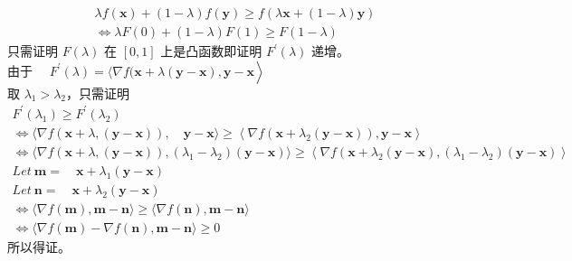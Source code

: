 \documentclass[11pt,letter,notitlepage]{article}
\begin{document}
\begin{solution}
\begin{enumerate}
			\begin{align*}
				\lambda f(\mathbf{x})+(1-\lambda) f(\mathbf{y}) \geqslant f(\lambda \mathbf{x}+(1-\lambda) \mathbf{y}) \\ \Leftrightarrow \lambda F(0)+(1-\lambda) F(1) \geqslant F(1-\lambda)
			\end{align*}
		只需证明 $F(\lambda)$ 在 $[0, 1]$ 上是凸函数即证明 $F^{\prime}(\lambda)$ 递增。\\
		由于 ${\left.\quad F^{\prime}(\lambda)=\langle\nabla f(\mathbf{x}+\lambda (\mathbf{y - x}), \mathbf{y - x}\right\rangle}$\\
		取 $\lambda_1 > \lambda_2 $，只需证明\\
		$\begin{array}{l} { F^{\prime}(\lambda_1) \geqslant F^{\prime}\left(\lambda_{2}\right)} \\ {\Leftrightarrow \langle \nabla f(\mathbf{x}+\lambda,(\mathbf{y}-\mathbf{x})), \quad \mathbf{y}-\mathbf{x} \rangle\geqslant\left\langle \nabla f\left(\mathbf{x}+\lambda_{2}(\mathbf{y}-\mathbf{x})\right), \mathbf{y}-\mathbf{x}\right\rangle} \\ {\Leftrightarrow \langle \nabla f(\mathbf{x}+\lambda,(\mathbf{y}-\mathbf{x})),\left(\lambda_1-\lambda_{2}\right)(\mathbf{y}-\mathbf{x}) \rangle \geqslant\left\langle\nabla f\left(\mathbf{x}+\lambda_{2}(\mathbf{y}-\mathbf{x}),(\lambda_1 - \lambda_2)(\mathbf{y} - \mathbf{x})\right \rangle \right.} \\ {Let \  \mathbf{m} = \quad \mathbf{x}+\lambda_{1}(\mathbf{y}-\mathbf{x})} \\ {Let \  \mathbf{n} = \quad \mathbf{x}+\lambda_{2}(\mathbf{y}-\mathbf{x})} \\ {\Leftrightarrow \langle\nabla f(\mathbf{m}), \mathbf{m}-\mathbf{n}\rangle \geqslant\langle\nabla f(\mathbf{n}), \mathbf{m}-\mathbf{n}\rangle} \\ {\Leftrightarrow \langle\nabla f(\mathbf{m}) - \nabla f(\mathbf{n}), \mathbf{m}-\mathbf{n}\rangle \geqslant 0} \end{array}$\\
		所以得证。
			
	\end{enumerate}

\end{solution}


\end{document}
